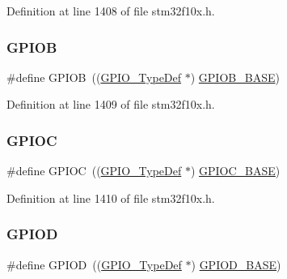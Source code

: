 Definition at line 1408 of file stm32f10x.\+h.

\mbox{\label{group___peripheral__declaration_ga68b66ac73be4c836db878a42e1fea3cd}} 
\subsubsection{\texorpdfstring{G\+P\+I\+OB}{GPIOB}}
{\footnotesize\ttfamily \#define G\+P\+I\+OB~((\hyperlink{struct_g_p_i_o___type_def}{G\+P\+I\+O\+\_\+\+Type\+Def} $\ast$) \hyperlink{group___peripheral__memory__map_gac944a89eb789000ece920c0f89cb6a68}{G\+P\+I\+O\+B\+\_\+\+B\+A\+SE})}



Definition at line 1409 of file stm32f10x.\+h.

\mbox{\label{group___peripheral__declaration_ga2dca03332d620196ba943bc2346eaa08}} 
\subsubsection{\texorpdfstring{G\+P\+I\+OC}{GPIOC}}
{\footnotesize\ttfamily \#define G\+P\+I\+OC~((\hyperlink{struct_g_p_i_o___type_def}{G\+P\+I\+O\+\_\+\+Type\+Def} $\ast$) \hyperlink{group___peripheral__memory__map_ga26f267dc35338eef219544c51f1e6b3f}{G\+P\+I\+O\+C\+\_\+\+B\+A\+SE})}



Definition at line 1410 of file stm32f10x.\+h.

\mbox{\label{group___peripheral__declaration_ga7580b1a929ea9df59725ba9c18eba6ac}} 
\subsubsection{\texorpdfstring{G\+P\+I\+OD}{GPIOD}}
{\footnotesize\ttfamily \#define G\+P\+I\+OD~((\hyperlink{struct_g_p_i_o___type_def}{G\+P\+I\+O\+\_\+\+Type\+Def} $\ast$) \hyperlink{group___peripheral__memory__map_ga1a93ab27129f04064089616910c296ec}{G\+P\+I\+O\+D\+\_\+\+B\+A\+SE})}



